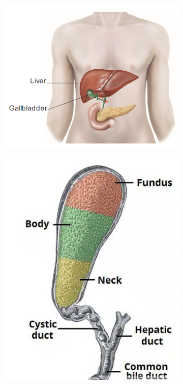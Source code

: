 \begin{figure}[!t]
\centering
	\begin{subfigure}[b]{0.5\linewidth}
	\centering
	\includegraphics[width=\linewidth]{figs/gallbladder.png}
		\caption{}
		\label{fig:gb_whole}
	\end{subfigure}
	\begin{subfigure}[b]{0.32\linewidth}
	\centering
	\includegraphics[width=\linewidth]{figs/gb_anatomy.png}

\end{subfigure}
\end{figure}

